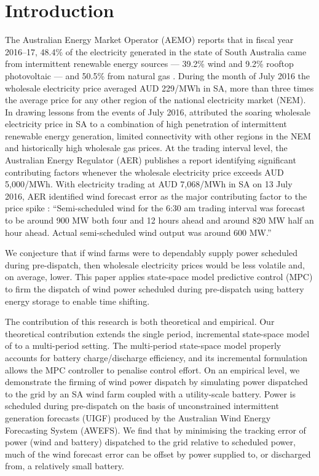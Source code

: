 \documentclass[a4paper, 10pt, twocolumn, preprint, 3p]{elsarticle}
\begin{document}
\section{Introduction}\label{sect:introduction}
The Australian Energy Market Operator (AEMO) reports that in fiscal year 2016--17, 48.4\% of the electricity generated in the state of South Australia came from intermittent renewable energy sources --- 39.2\% wind and 9.2\% rooftop photovoltaic --- and 50.5\% from natural gas \cite{SAER17}.  During the month of July 2016 the wholesale electricity price averaged AUD 229/MWh in SA, more than three times the average price for any other region of the national electricity market (NEM).  In drawing lessons from the events of July 2016, \cite{WB16} attributed the soaring wholesale electricity price in SA to a combination of high penetration of intermittent renewable energy generation, limited connectivity with other regions in the NEM and historically high wholesale gas prices.  At the trading interval level, the Australian Energy Regulator (AER) publishes a report identifying significant contributing factors whenever the wholesale electricity price exceeds AUD 5,000/MWh.  With electricity trading at AUD 7,068/MWh in SA on 13 July 2016, AER identified wind forecast error as the major contributing factor to the price spike \cite{AER16}: ``Semi-scheduled wind for the 6:30 am trading interval was forecast to be around 900 MW both four and 12 hours ahead and around 820 MW half an hour ahead.  Actual semi-scheduled wind output was around 600 MW.''

We conjecture that if wind farms were to dependably supply power scheduled during pre-dispatch, then wholesale electricity prices would be less volatile and, on average, lower.  This paper applies state-space model predictive control (MPC) to firm the dispatch of wind power scheduled during pre-dispatch using battery energy storage to enable time shifting.

The contribution of this research is both theoretical and empirical.  Our theoretical contribution extends the single period, incremental state-space model of \cite{TREB16} to a multi-period setting.  The multi-period state-space model properly accounts for battery charge/discharge efficiency, and its incremental formulation allows the MPC controller to penalise control effort.  On an empirical level, we demonstrate the firming of wind power dispatch by simulating power dispatched to the grid by an SA wind farm coupled with a utility-scale battery.  Power is scheduled during pre-dispatch on the basis of unconstrained intermittent generation forecasts (UIGF) produced by the Australian Wind Energy Forecasting System (AWEFS).  We find that by minimising the tracking error of power (wind and battery) dispatched to the grid relative to scheduled power, much of the wind forecast error can be offset by power supplied to, or discharged from, a relatively small battery.
\end{document}
